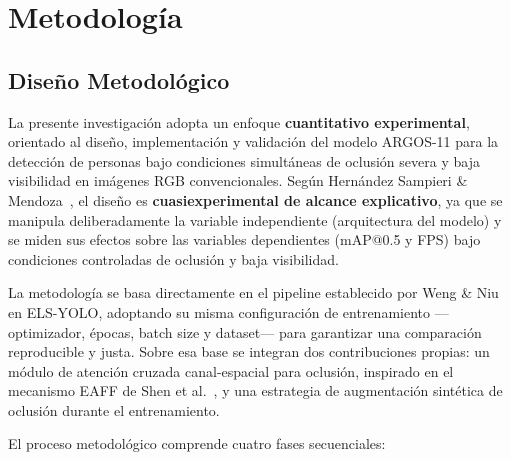 \section{Metodolog\'ia}

\subsection{Dise\~{n}o Metodol\'ogico}

La presente investigaci\'on adopta un enfoque
\textbf{cuantitativo experimental}, orientado al dise\~{n}o,
implementaci\'on y validaci\'on del modelo ARGOS-11 para la
detecci\'on de personas bajo condiciones simult\'aneas de
oclusi\'on severa y baja visibilidad en im\'agenes RGB
convencionales. Seg\'un Hern\'andez Sampieri \&
Mendoza~\cite{Hernandez2018}, el dise\~{n}o es
\textbf{cuasiexperimental de alcance explicativo}, ya que se
manipula deliberadamente la variable independiente (arquitectura
del modelo) y se miden sus efectos sobre las variables dependientes
(mAP@0.5 y FPS) bajo condiciones controladas de oclusi\'on y
baja visibilidad.

La metodolog\'ia se basa directamente en el pipeline establecido
por Weng \& Niu~\cite{ElsYolo2025} en ELS-YOLO, adoptando su
misma configuraci\'on de entrenamiento ---optimizador, \'epocas,
batch size y dataset--- para garantizar una comparaci\'on
reproducible y justa. Sobre esa base se integran dos
contribuciones propias: un m\'odulo de atenci\'on cruzada
canal-espacial para oclusi\'on, inspirado en el mecanismo EAFF de
Shen et al.~\cite{Shen2025}, y una estrategia de augmentaci\'on
sint\'etica de oclusi\'on durante el entrenamiento.

El proceso metodol\'ogico comprende cuatro fases secuenciales:

